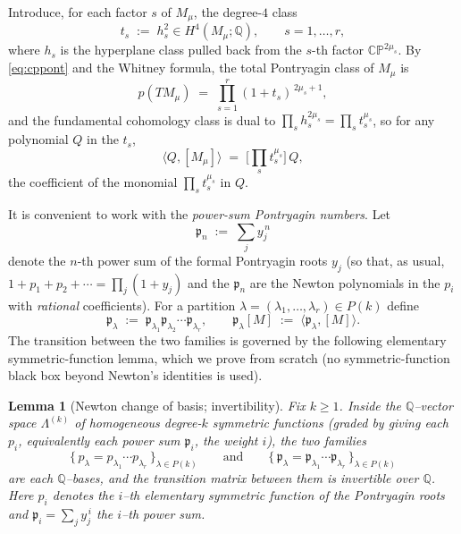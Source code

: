 \documentclass[12pt]{article}
\newtheorem{lemma}{Lemma}
\theoremstyle{definition}
\begin{document}
Introduce, for each factor $s$ of $M_\mu$, the degree-$4$ class
\[
t_s\;:=\;h_s^2\in H^4(M_\mu;\mathbb{Q}),
\qquad s=1,\dots,r,
\]
where $h_s$ is the hyperplane class pulled back from the $s$-th factor
$\mathbb{CP}^{2\mu_s}$.  By \eqref{eq:cppont} and the Whitney formula, the total
Pontryagin class of $M_\mu$ is
\[
p(TM_\mu)\;=\;\prod_{s=1}^{r}(1+t_s)^{\,2\mu_s+1},
\tag{4}\label{eq:prodp}
\]
and the fundamental cohomology class is dual to $\prod_s h_s^{2\mu_s}=\prod_s t_s^{\mu_s}$,
so for any polynomial $Q$ in the $t_s$,
\[
\langle Q,[M_\mu]\rangle\;=\;\big[\textstyle\prod_s t_s^{\mu_s}\big]\,Q,
\tag{5}\label{eq:pair}
\]
the coefficient of the monomial $\prod_s t_s^{\mu_s}$ in $Q$.

It is convenient to work with the \emph{power-sum Pontryagin numbers}.  Let
\[
\mathfrak{p}_n\;:=\;\sum_{j} y_j^{\,n}
\]
denote the $n$-th power sum of the formal Pontryagin roots $y_j$ (so that, as usual,
$1+p_1+p_2+\cdots=\prod_j(1+y_j)$ and the $\mathfrak{p}_n$ are the Newton polynomials in
the $p_i$ with \emph{rational} coefficients).  For a partition
$\lambda=(\lambda_1,\dots,\lambda_r)\in P(k)$ define
\[
\mathfrak{p}_\lambda\;:=\;\mathfrak{p}_{\lambda_1}\mathfrak{p}_{\lambda_2}\cdots
\mathfrak{p}_{\lambda_r},
\qquad
\mathfrak{p}_\lambda[M]\;:=\;\langle\mathfrak{p}_\lambda,[M]\rangle.
\]
The transition between the two families is governed by the following elementary
symmetric-function lemma, which we prove from scratch (no symmetric-function black box
beyond Newton's identities is used).

\begin{lemma}[Newton change of basis; invertibility]\label{lem:newton}
Fix $k\ge1$. Inside the $\mathbb{Q}$--vector space $\Lambda^{(k)}$ of homogeneous degree-$k$
symmetric functions (graded by giving each $p_i$, equivalently each power sum $\mathfrak p_i$,
the weight $i$), the two families
\[
\{\,p_\lambda=p_{\lambda_1}\cdots p_{\lambda_r}\,\}_{\lambda\in P(k)}
\qquad\text{and}\qquad
\{\,\mathfrak p_\lambda=\mathfrak p_{\lambda_1}\cdots \mathfrak p_{\lambda_r}\,\}_{\lambda\in P(k)}
\]
are each $\mathbb{Q}$--bases, and the transition matrix between them is invertible over
$\mathbb{Q}$. Here $p_i$ denotes the $i$--th elementary symmetric function of the Pontryagin
roots and $\mathfrak p_i=\sum_j y_j^{\,i}$ the $i$--th power sum.
\end{lemma}
\end{document}
